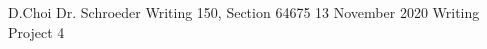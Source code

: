 \documentclass[12pt, letterpaper]{article}
\begin{document}
\begin{mla}
	{D.}{Choi}
	{Dr. Schroeder}
	{Writing 150, Section 64675}
	{13 November 2020}
	{Writing Project 4}


\begin{workscited}
\end{workscited}


\end{mla}
\end{document}

